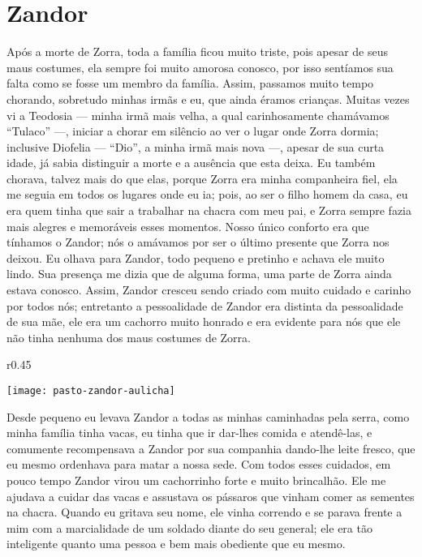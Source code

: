 \cleardoublepage
\newpage
\ifdefined\EnableIncludeImages
\fi
\chapter{Zandor}

Após a morte de Zorra, toda a família ficou muito triste, pois apesar de seus maus costumes, ela sempre foi muito amorosa conosco, por isso sentíamos sua falta como se fosse um membro da família. 
Assim, passamos muito tempo chorando, sobretudo minhas irmãs e eu, que ainda éramos crianças. 
Muitas vezes vi a Teodosia ---  minha irmã mais velha, a qual carinhosamente chamávamos ``Tulaco'' ---, iniciar a chorar em silêncio ao ver o lugar onde Zorra dormia; inclusive Diofelia  --- ``Dio'', a minha irmã mais nova ---, apesar de sua curta idade, já sabia distinguir a morte e a ausência que esta deixa. 
Eu também chorava, talvez mais do que elas, porque Zorra era minha companheira fiel, ela me seguia em todos os lugares onde eu ia; pois, ao ser o filho homem da casa, eu era quem tinha que sair a trabalhar na chacra com meu pai, e Zorra sempre fazia mais alegres e memoráveis esses momentos.
Nosso único conforto era que tínhamos o Zandor; nós o amávamos por ser o último presente que Zorra nos deixou.
Eu olhava para Zandor, todo pequeno e pretinho e achava ele muito lindo. Sua presença me dizia que de alguma forma, uma parte de Zorra ainda estava conosco. 
Assim, Zandor cresceu sendo criado com muito cuidado e carinho por todos nós;
entretanto a pessoalidade de Zandor era distinta da pessoalidade de sua mãe, ele era um cachorro muito honrado e era evidente para nós que ele não tinha nenhuma dos maus costumes de Zorra. 
\ifdefined\EnableIncludeImages
\begin{wrapfigure}{r}{0.45\textwidth}
  \begin{center}
  \vspace{-20pt}
    \texttt{[image: pasto-zandor-aulicha]}
  \end{center}
  \vspace{-20pt}
\end{wrapfigure}
\fi
Desde pequeno eu levava Zandor a todas as minhas caminhadas pela serra, como minha família tinha vacas, eu tinha que ir dar-lhes comida e atendê-las, e comumente recompensava a Zandor por sua companhia dando-lhe leite fresco, que eu mesmo ordenhava para matar a nossa sede. 
Com todos esses cuidados, em pouco tempo Zandor virou um cachorrinho forte e muito brincalhão.
Ele me ajudava a cuidar das vacas e assustava os pássaros que vinham comer as sementes na chacra. Quando eu gritava seu nome, ele vinha correndo e se parava frente a mim com a marcialidade de um soldado diante do seu general; ele era tão inteligente quanto uma pessoa e bem mais obediente que eu mesmo.

